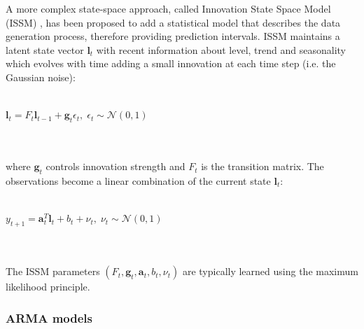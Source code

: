 \documentclass[a4paper, 12pt]{article} %
\begin{document}
	A more complex state-space approach, called Innovation State Space Model (ISSM) \cite{ExponentialSmoothingStateSpace}, has been proposed to add a statistical model that describes the data generation process, therefore providing prediction intervals. ISSM maintains a latent state vector $\pmb{l}_t$ with recent information about level, trend and seasonality which evolves with time adding a small innovation at each time step (i.e. the Gaussian noise):\\\\
	\centerline{
		$
		\pmb{l}_t = F_t \pmb{l}_{t-1} + \pmb{g}_t \epsilon_t,\; \epsilon_t \sim \mathcal{N}(0,1)
		$
	}\\\\
	where $\pmb{g}_t$ controls innovation strength and $F_t$ is the transition matrix. 
	The observations become a linear combination of the current state $\pmb{l}_t$:\\\\
	\centerline{$
		y_{t+1} = \pmb{a}_{t}^T \pmb{l}_t + b_{t} + \nu_t,\; \nu_t \sim \mathcal{N}(0,1)
		$}\\\\
	The ISSM parameters $(F_t, \pmb{g}_t, \pmb{a}_t, b_t, \nu_t)$ are typically learned using the maximum likelihood principle.
	
	\subsubsection{ARMA models} \label{sssec:arma}
	
\end{document}
